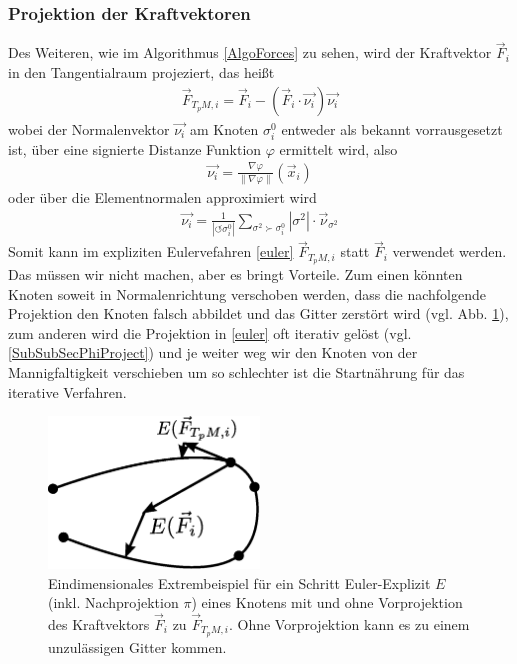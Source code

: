   \subsubsection{Projektion der Kraftvektoren}
    Des Weiteren, wie im Algorithmus \ref{AlgoForces} zu sehen, wird der Kraftvektor \( \vec{F}_{i} \) in den Tangentialraum projeziert, das heißt
    \begin{align}
      \vec{F}_{T_{p}M,i} = \vec{F}_{i} - (\vec{F}_{i}\cdot\vec{\nu_{i}})\vec{\nu_{i}}
    \end{align}
    wobei der Normalenvektor \( \vec{\nu_{i}}  \) am Knoten \( \sigma^{0}_{i} \) entweder als bekannt vorrausgesetzt ist,
    über eine signierte Distanze Funktion \( \varphi \) ermittelt wird, also
    \begin{align}
      \vec{\nu_{i}} = \frac{\nabla\varphi}{\|\nabla\varphi\|}(\vec{x}_{i})
    \end{align}
    oder über die Elementnormalen approximiert wird
    \begin{align}
      \vec{\nu_{i}} = \frac{1}{|\circlearrowleft\sigma^{0}_{i}|} \sum_{\sigma^{2}\succ\sigma^{0}_{i}} |\sigma^{2}|\cdot \vec{\nu}_{\sigma^{2}}
    \end{align}
    Somit kann im expliziten Eulervefahren \eqref{euler} \( \vec{F}_{T_{p}M,i}\) statt \( \vec{F}_{i} \) verwendet werden.
    Das müssen wir nicht machen, aber es bringt Vorteile. 
    Zum einen könnten Knoten soweit in Normalenrichtung verschoben werden, dass die nachfolgende Projektion den Knoten falsch abbildet und das Gitter zerstört wird 
    (vgl. Abb. \ref{AbbFatalEuler}), zum anderen wird die Projektion in \eqref{euler} oft iterativ gelöst (vgl. \ref{SubSubSecPhiProject}) und je weiter weg wir den Knoten von der
    Mannigfaltigkeit verschieben um so schlechter ist die Startnährung für das iterative Verfahren.
    \begin{figure}
      \centering
      \includegraphics[width=0.5\textwidth]{bilder/meshCorrector/fatalEuler.eps}
      \caption[Euler mit und ohne Vorprojektion]{Eindimensionales Extrembeispiel für ein Schritt Euler-Explizit \( E \) (inkl. Nachprojektion \( \pi \))
                                                  eines Knotens mit und ohne Vorprojektion des Kraftvektors \( \vec{F}_{i} \)
                                                 zu \( \vec{F}_{T_{p}M,i}\). 
                                                 Ohne Vorprojektion kann es zu einem unzulässigen Gitter kommen.}
      \label{AbbFatalEuler}
    \end{figure}


